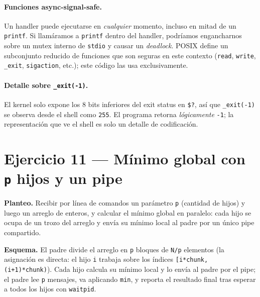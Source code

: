 \documentclass[11pt,a4paper]{article}
\begin{document}
\paragraph{Funciones async-signal-safe.}
Un handler puede ejecutarse en \emph{cualquier} momento, incluso en
mitad de un \texttt{printf}. Si llamáramos a \texttt{printf} dentro del
handler, podríamos engancharnos sobre un mutex interno de \texttt{stdio}
y causar un \emph{deadlock}. POSIX define un subconjunto reducido de
funciones que son seguras en este contexto (\texttt{read},
\texttt{write}, \texttt{\_exit}, \texttt{sigaction}, etc.); este código
las usa exclusivamente.

\paragraph{Detalle sobre \texttt{\_exit(-1)}.}
El kernel solo expone los 8 bits inferiores del exit status en
\texttt{\$?}, así que \texttt{\_exit(-1)} se observa desde el shell
como \texttt{255}. El programa retorna \emph{lógicamente} \texttt{-1};
la representación que ve el shell es solo un detalle de codificación.

\section{Ejercicio 11 --- Mínimo global con \texttt{p} hijos y un pipe}

\textbf{Planteo.} Recibir por línea de comandos un parámetro
\texttt{p} (cantidad de hijos) y luego un arreglo de enteros, y
calcular el mínimo global en paralelo: cada hijo se ocupa de un trozo
del arreglo y envía su mínimo local al padre por un único pipe
compartido.

\textbf{Esquema.} El padre divide el arreglo en \texttt{p} bloques de
\texttt{N/p} elementos (la asignación es directa: el hijo \texttt{i}
trabaja sobre los índices \texttt{[i*chunk, (i+1)*chunk)}). Cada hijo
calcula su mínimo local y lo envía al padre por el pipe; el padre lee
\texttt{p} mensajes, va aplicando \texttt{min}, y reporta el resultado
final tras esperar a todos los hijos con \texttt{waitpid}.
\end{document}
